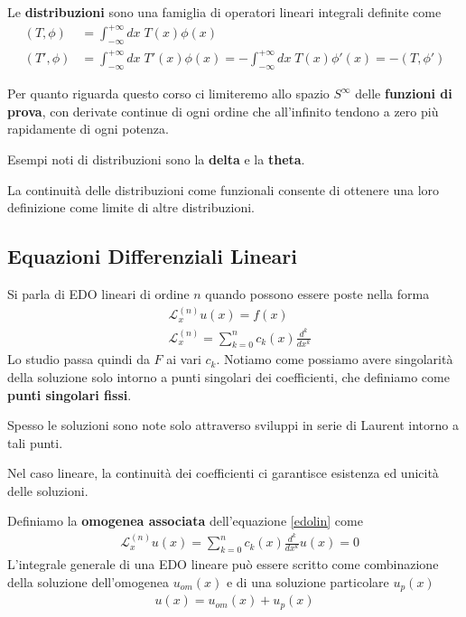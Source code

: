 Le \textbf{distribuzioni} sono una famiglia di operatori lineari integrali definite come
\begin{align}
	(T,\phi) &= \int_{-\infty}^{+\infty} dx \; T(x) \phi(x)\\
	(T',\phi) &= \int_{-\infty}^{+\infty} dx \; T'(x) \phi(x) = -\int_{-\infty}^{+\infty} dx \; T(x) \phi'(x) = -(T,\phi')
\end{align}

Per quanto riguarda questo corso ci limiteremo allo spazio $S^{\infty}$ delle \textbf{funzioni di prova}, con derivate continue di ogni ordine che all'infinito tendono a zero più rapidamente di ogni potenza.

Esempi noti di distribuzioni sono la \textbf{delta} e la \textbf{theta}.

La continuità delle distribuzioni come funzionali consente di ottenere una loro definizione come limite di altre distribuzioni.

\subsection{Equazioni Differenziali Lineari}
Si parla di EDO lineari di ordine $n$ quando possono essere poste nella forma
\begin{align}
	&\mathcal{L}^{(n)}_x u(x) = f(x) \label{edolin}\\
	&\mathcal{L}^{(n)}_x = \sum_{k=0}^{n} c_k(x) \frac{d^k}{dx^k}
\end{align}
Lo studio passa quindi da $F$ ai vari $c_k$. Notiamo come possiamo avere singolarità della soluzione solo intorno a punti singolari dei coefficienti, che definiamo come \textbf{punti singolari fissi}.

Spesso le soluzioni sono note solo attraverso sviluppi in serie di Laurent intorno a tali punti.

Nel caso lineare, la continuità dei coefficienti ci garantisce esistenza ed unicità delle soluzioni.

Definiamo la \textbf{omogenea associata} dell'equazione \ref{edolin} come
\begin{align}
	&\mathcal{L}^{(n)}_x u(x) = \sum_{k=0}^{n} c_k(x) \frac{d^k}{dx^k}u(x) = 0
\end{align}
L'integrale generale di una EDO lineare può essere scritto come combinazione della soluzione dell'omogenea $u_{om}(x)$ e di una soluzione particolare $u_{p}(x)$
\begin{align}
	u(x) = u_{om}(x) + u_{p}(x)
\end{align}


